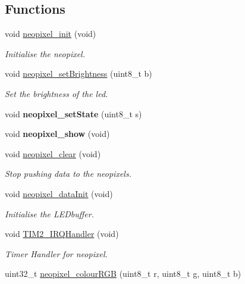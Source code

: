 \subsection*{Functions}
\begin{DoxyCompactItemize}
\item 
void \hyperlink{group___neo_pixel_gaac78468985e44a3e4d353ea9276b33bc}{neopixel\+\_\+init} (void)
\begin{DoxyCompactList}\small\item\em Initialise the neopixel. \end{DoxyCompactList}\item 
void \hyperlink{group___neo_pixel_gae027558106eef5c81996294f4561fecb}{neopixel\+\_\+set\+Brightness} (uint8\+\_\+t b)
\begin{DoxyCompactList}\small\item\em Set the brightness of the led. \end{DoxyCompactList}\item 
\mbox{\label{group___neo_pixel_gada44b0356745943702c92d394760cd3e}} 
void {\bfseries neopixel\+\_\+set\+State} (uint8\+\_\+t s)
\item 
\mbox{\label{group___neo_pixel_gadb692027c25b23852a28f2ca43dc2399}} 
void {\bfseries neopixel\+\_\+show} (void)
\item 
void \hyperlink{group___neo_pixel_ga8e3cfef785ce221672f825f8785c25b8}{neopixel\+\_\+clear} (void)
\begin{DoxyCompactList}\small\item\em Stop pushing data to the neopixels. \end{DoxyCompactList}\item 
void \hyperlink{group___neo_pixel_ga79e34feddcfb2c45ae218166c84bdff4}{neopixel\+\_\+data\+Init} (void)
\begin{DoxyCompactList}\small\item\em Initialise the L\+E\+Dbuffer. \end{DoxyCompactList}\item 
void \hyperlink{group___neo_pixel_ga38ad4725462bdc5e86c4ead4f04b9fc2}{T\+I\+M2\+\_\+\+I\+R\+Q\+Handler} (void)
\begin{DoxyCompactList}\small\item\em Timer Handler for neopixel. \end{DoxyCompactList}\item 
uint32\+\_\+t \hyperlink{group___neo_pixel_ga1d500fbcbecad76feef8835437687ca0}{neopixel\+\_\+colour\+R\+GB} (uint8\+\_\+t r, uint8\+\_\+t g, uint8\+\_\+t b)

\end{DoxyCompactItemize}
